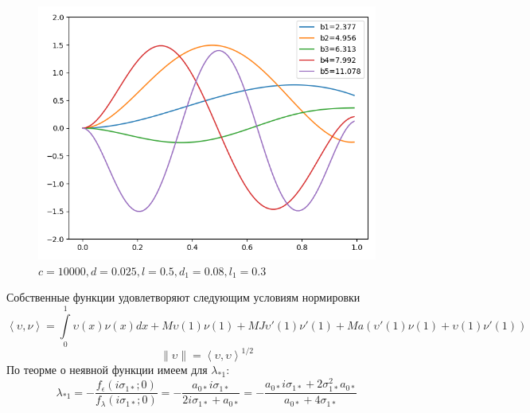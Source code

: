 \documentclass[12pt, a4paper]{extarticle}
\begin{document}
			\begin{figure}[h!]
             \centering
              \includegraphics[scale=0.6]{EigenFunc(c=10000)}
              \caption{$c=10000, d=0.025, l=0.5, d_1=0.08, l_1=0.3$}
			\end{figure}
			\newpage
			Собственные функции удовлетворяют следующим условиям нормировки
			\begin{equation*}
			\left<\upsilon,\nu \right>=\int\limits_0^1 \upsilon(x) \nu(x) dx +M\upsilon(1)\nu(1) + M J \upsilon'(1)\nu'(1) + M a (\upsilon'(1)\nu(1)+\upsilon(1)\nu'(1))
			\end{equation*}
			\begin{equation*}
			\|\upsilon\|=\left<\upsilon, \upsilon \right>^{1/2}
			\end{equation*}
				\newpage
				По теорме о неявной функции имеем для $\lambda_{*1}$:
$$\lambda_{*1} = - \frac {f_{\epsilon}(i\sigma_{1*}; 0)}{f_{\lambda}(i\sigma_{1*}; 0)} = - \frac{a_{0*} i \sigma_{1*}}{2 i \sigma_{1*} + a_{0*}} = - \frac{a_{0*} i \sigma_{1*} + 2 \sigma_{1*}^2 a_{0*}}{a_{0*} + 4 \sigma_{1*}}$$
\end{document}
